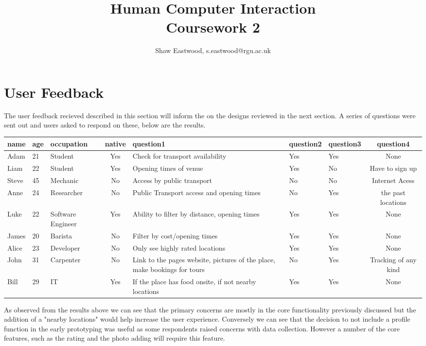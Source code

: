 \documentclass{article}
\title{Human Computer Interaction \\ Coursework 2}
\author{Shaw Eastwood, s.eastwood@rgu.ac.uk}
\begin{document}
	\maketitle

	\section{User Feedback}
	The user feedback recieved described in this section will inform the on the designs reviewed in the next section.
	A series of questions were sent out and users asked to respond on these, below are the results.
\begin{table}[H]
\hspace{-3cm}
\begin{tabular}{lllcp{3cm}llc}
\hline
	name & age & occupation & native & question1 & question2 & question3 & question4 \\
\hline
	Adam & 21 & Student & Yes & Check for transport availability & Yes & Yes & None \\
	Liam & 22 & Student & Yes & Opening times of venue & Yes & No & Have to sign up \\
	Steve & 45 & Mechanic & No & Access by public transport & No & No & Internet Acess \\
	Anne & 24 & Researcher & No & Public Transport access and opening times & No & Yes & the past locations \\
	Luke & 22 & Software Engineer & Yes & Ability to filter by distance, opening times & Yes & Yes & None \\
	James & 20 & Barista & No & Filter by cost/opening times & Yes & Yes & None \\
	Alice & 23 & Developer & No & Only see highly rated locations & Yes & Yes & None \\
	John & 31 & Carpenter & No & Link to the pages website, pictures of the place, make bookings for tours & No & Yes & Tracking of any kind \\
	Bill & 29 & IT & Yes & If the place has food onsite, if not nearby locations & Yes & Yes & None \\
\hline
\end{tabular}
\end{table}
	As observed from the results above we can see that the primary concerns are mostly in the core functionality previously discussed but the addition of a "nearby locations" would help increase the user experience.
	Conversely we can see that the decision to not include a profile function in the early prototyping was useful as some respondents raised concerns with data collection.
	However a number of the core features, such as the rating and the photo adding will require this feature.
\end{document}

